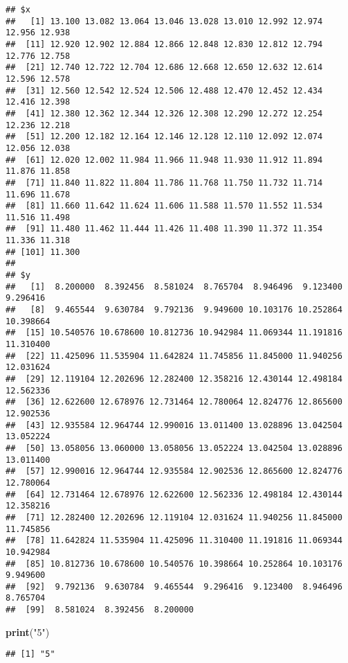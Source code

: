\documentclass[]{article}
\newenvironment{Shaded}{\begin{snugshade}}{\end{snugshade}}
\newcommand{\KeywordTok}[1]{\textcolor[rgb]{0.13,0.29,0.53}{\textbf{#1}}}
\newcommand{\StringTok}[1]{\textcolor[rgb]{0.31,0.60,0.02}{#1}}
\newcommand{\NormalTok}[1]{#1}
\begin{document}
\begin{verbatim}
## $x
##   [1] 13.100 13.082 13.064 13.046 13.028 13.010 12.992 12.974 12.956 12.938
##  [11] 12.920 12.902 12.884 12.866 12.848 12.830 12.812 12.794 12.776 12.758
##  [21] 12.740 12.722 12.704 12.686 12.668 12.650 12.632 12.614 12.596 12.578
##  [31] 12.560 12.542 12.524 12.506 12.488 12.470 12.452 12.434 12.416 12.398
##  [41] 12.380 12.362 12.344 12.326 12.308 12.290 12.272 12.254 12.236 12.218
##  [51] 12.200 12.182 12.164 12.146 12.128 12.110 12.092 12.074 12.056 12.038
##  [61] 12.020 12.002 11.984 11.966 11.948 11.930 11.912 11.894 11.876 11.858
##  [71] 11.840 11.822 11.804 11.786 11.768 11.750 11.732 11.714 11.696 11.678
##  [81] 11.660 11.642 11.624 11.606 11.588 11.570 11.552 11.534 11.516 11.498
##  [91] 11.480 11.462 11.444 11.426 11.408 11.390 11.372 11.354 11.336 11.318
## [101] 11.300
## 
## $y
##   [1]  8.200000  8.392456  8.581024  8.765704  8.946496  9.123400  9.296416
##   [8]  9.465544  9.630784  9.792136  9.949600 10.103176 10.252864 10.398664
##  [15] 10.540576 10.678600 10.812736 10.942984 11.069344 11.191816 11.310400
##  [22] 11.425096 11.535904 11.642824 11.745856 11.845000 11.940256 12.031624
##  [29] 12.119104 12.202696 12.282400 12.358216 12.430144 12.498184 12.562336
##  [36] 12.622600 12.678976 12.731464 12.780064 12.824776 12.865600 12.902536
##  [43] 12.935584 12.964744 12.990016 13.011400 13.028896 13.042504 13.052224
##  [50] 13.058056 13.060000 13.058056 13.052224 13.042504 13.028896 13.011400
##  [57] 12.990016 12.964744 12.935584 12.902536 12.865600 12.824776 12.780064
##  [64] 12.731464 12.678976 12.622600 12.562336 12.498184 12.430144 12.358216
##  [71] 12.282400 12.202696 12.119104 12.031624 11.940256 11.845000 11.745856
##  [78] 11.642824 11.535904 11.425096 11.310400 11.191816 11.069344 10.942984
##  [85] 10.812736 10.678600 10.540576 10.398664 10.252864 10.103176  9.949600
##  [92]  9.792136  9.630784  9.465544  9.296416  9.123400  8.946496  8.765704
##  [99]  8.581024  8.392456  8.200000
\end{verbatim}

\begin{Shaded}
\begin{Highlighting}[]
\KeywordTok{print}\NormalTok{(}\StringTok{"5"}\NormalTok{)}
\end{Highlighting}
\end{Shaded}

\begin{verbatim}
## [1] "5"
\end{verbatim}
\end{document}
